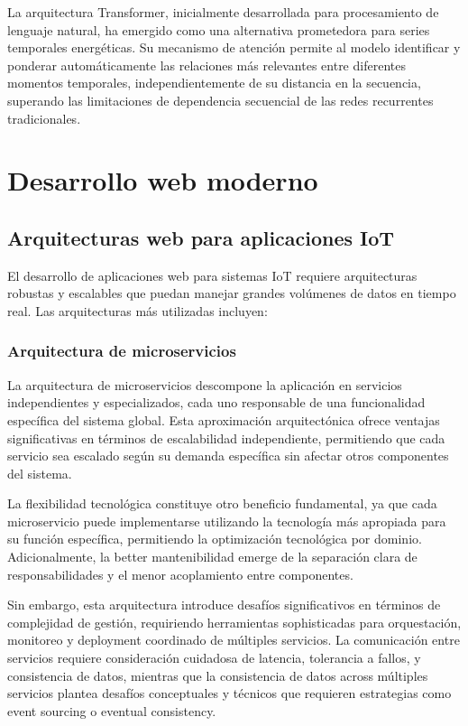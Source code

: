 La arquitectura Transformer, inicialmente desarrollada para procesamiento de lenguaje natural, ha emergido como una alternativa prometedora para series temporales energéticas. Su mecanismo de atención permite al modelo identificar y ponderar automáticamente las relaciones más relevantes entre diferentes momentos temporales, independientemente de su distancia en la secuencia, superando las limitaciones de dependencia secuencial de las redes recurrentes tradicionales.

\section{Desarrollo web moderno}

\subsection{Arquitecturas web para aplicaciones IoT}

El desarrollo de aplicaciones web para sistemas IoT requiere arquitecturas robustas y escalables que puedan manejar grandes volúmenes de datos en tiempo real. Las arquitecturas más utilizadas incluyen:

\subsubsection{Arquitectura de microservicios}

La arquitectura de microservicios descompone la aplicación en servicios independientes y especializados, cada uno responsable de una funcionalidad específica del sistema global. Esta aproximación arquitectónica ofrece ventajas significativas en términos de escalabilidad independiente, permitiendo que cada servicio sea escalado según su demanda específica sin afectar otros componentes del sistema.

La flexibilidad tecnológica constituye otro beneficio fundamental, ya que cada microservicio puede implementarse utilizando la tecnología más apropiada para su función específica, permitiendo la optimización tecnológica por dominio. Adicionalmente, la better mantenibilidad emerge de la separación clara de responsabilidades y el menor acoplamiento entre componentes.

Sin embargo, esta arquitectura introduce desafíos significativos en términos de complejidad de gestión, requiriendo herramientas sophisticadas para orquestación, monitoreo y deployment coordinado de múltiples servicios. La comunicación entre servicios requiere consideración cuidadosa de latencia, tolerancia a fallos, y consistencia de datos, mientras que la consistencia de datos across múltiples servicios plantea desafíos conceptuales y técnicos que requieren estrategias como event sourcing o eventual consistency.


